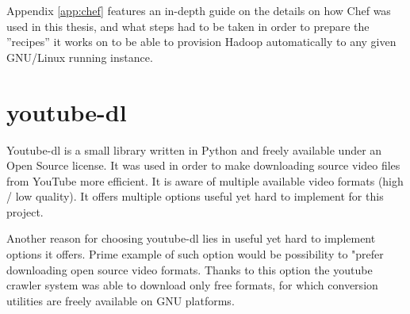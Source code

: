 Appendix \ref{app:chef} features an in-depth guide on the details on how Chef was used in this thesis, and what steps had to be taken in order to prepare the ''recipes'' it works on to be able to provision Hadoop automatically to any given GNU/Linux running instance.


%
\section{youtube-dl}
Youtube-dl is a small library written in Python and freely available under an Open Source license. 
It was used in order to make downloading source video files from YouTube more efficient. It is aware of multiple available video formats (high / low quality). It offers multiple options useful yet hard to implement for this project.

Another reason for choosing youtube-dl lies in useful yet hard to implement options it offers. Prime example of such option would be possibility to "prefer downloading open source video formats. Thanks to this option the youtube crawler system was able to download only free formats, for which conversion utilities are freely available on GNU platforms.

%
%











